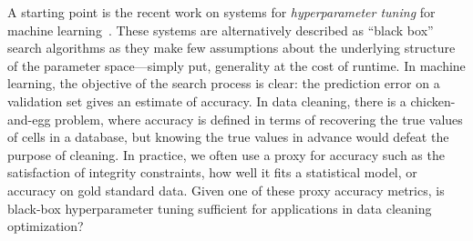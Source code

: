 





A starting point is the recent work on systems for \emph{hyperparameter tuning} for machine learning~\cite{li2017hyperband, sparks2017keystoneml, baylor2017tfx, golovin2017google, liaw2018tune}.
These systems are alternatively described as ``black box'' search algorithms as they make few assumptions about the underlying structure of the parameter space---simply put, generality at the cost of runtime.
In machine learning, the objective of the search process is clear: the prediction error on a validation set gives an estimate of accuracy. 
In data cleaning, there is a chicken-and-egg problem, where accuracy is defined in terms of recovering the true values of cells in a database, but knowing the true values in advance would defeat the purpose of cleaning.
In practice, we often use a proxy for accuracy such as the satisfaction of integrity constraints, how well it fits a statistical model, or accuracy on gold standard data.
Given one of these proxy accuracy metrics, is black-box hyperparameter tuning sufficient for applications in data cleaning optimization?

